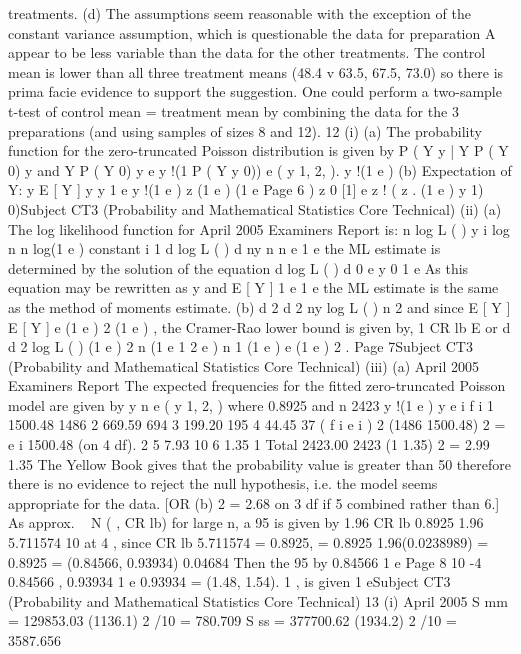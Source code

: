 \documentclass[a4paper,12pt]{article}
\begin{document}
\begin{enumerate}
treatments.
(d) The assumptions seem reasonable
with the exception of the constant
variance assumption, which is questionable
the data for preparation
A appear to be less variable than the data for the other treatments.
The control mean is lower than all three treatment means
(48.4 v 63.5, 67.5, 73.0) so there is prima facie evidence to support the
suggestion.
One could perform a two-sample t-test of control mean = treatment mean
by combining the data for the 3 preparations (and using samples of sizes 8
and 12).
12
(i)
(a)
The probability function for the zero-truncated Poisson distribution is
given by
P ( Y
y | Y
P ( Y
0)
y and Y
P ( Y 0)
y
e
y !(1 P ( Y
y
0))
e
( y 1, 2, ).
y !(1 e )
(b)
Expectation of Y:
y
E [ Y ]
y
y 1
e
y !(1 e )
z
(1 e )
(1 e
Page 6
)
z 0
[1]
e
z !
( z
.
(1 e
)
y 1)
0)Subject CT3 (Probability and Mathematical Statistics Core Technical)
(ii)
(a)
The log likelihood function for
April 2005
Examiners Report
is:
n
log L ( )
y i log
n
n log(1 e )
constant
i 1
d log L ( )
d
ny
n n
e
1 e
the ML estimate is determined by the solution of the equation
d log L ( )
d
0
e
y
0
1 e
As this equation may be rewritten as
y
and E [ Y ]
1 e
1 e
the ML estimate is the same as the method of moments estimate.
(b)
d 2
d
2
ny
log L ( )
n
2
and since E [ Y ] E [ Y ]
e
(1 e ) 2
(1 e )
, the Cramer-Rao lower bound is
given by,
1
CR lb
E
or
d
d
2
log L ( )
(1 e ) 2
n (1 e
1
2
e )
n
1
(1 e )
e
(1 e ) 2
.
Page 7Subject CT3 (Probability and Mathematical Statistics Core Technical)
(iii)
(a)
April 2005
Examiners Report
The expected frequencies for the fitted zero-truncated Poisson model
are given by
y
n
e
( y 1, 2, ) where
0.8925 and n
2423
y !(1 e )
y
e i
f i
1
1500.48
1486
2
669.59
694
3
199.20
195
4
44.45
37
( f i e i ) 2
(1486 1500.48) 2
=
e i
1500.48
(on 4 df).
2
5
7.93
10
6
1.35
1
Total
2423.00
2423
(1 1.35) 2
= 2.99
1.35
The Yellow Book gives that the probability value is greater than 50%
therefore there is no evidence to reject the null hypothesis, i.e. the
model seems appropriate for the data.
[OR
(b)
2
= 2.68 on 3 df if
5 combined rather than 6.]
As approx. ~ N ( , CR lb) for large n, a 95%
is given by
1.96 CR lb
0.8925 1.96 5.711574 10
at
4
, since CR lb
5.711574
= 0.8925,
= 0.8925 1.96(0.0238989) = 0.8925
= (0.84566, 0.93934)
0.04684
Then the 95%
by
0.84566
1 e
Page 8
10 -4
0.84566
,
0.93934
1 e
0.93934
= (1.48, 1.54).
1
, is given
1 eSubject CT3 (Probability and Mathematical Statistics Core Technical)
13
(i)
April 2005
S mm = 129853.03 (1136.1) 2 /10 = 780.709
S ss = 377700.62 (1934.2) 2 /10 = 3587.656

\end{enumerate}
\end{document}
